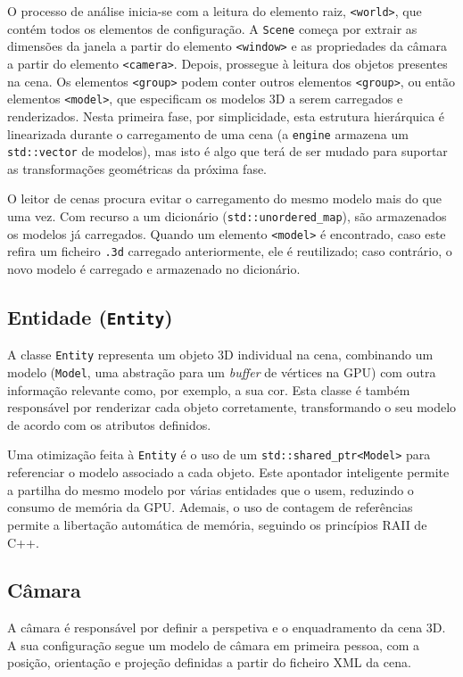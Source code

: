 \documentclass[12pt, a4paper]{article}
\begin{document}
O processo de análise inicia-se com a leitura do elemento raiz, \texttt{<world>}, que contém todos
os elementos de configuração. A \texttt{Scene} começa por extrair as dimensões da janela a partir do
elemento \texttt{<window>} e as propriedades da câmara a partir do elemento \texttt{<camera>}.
Depois, prossegue à leitura dos objetos presentes na cena. Os elementos \texttt{<group>} podem
conter outros elementos \texttt{<group>}, ou então elementos \texttt{<model>}, que especificam os
modelos 3D a serem carregados e renderizados. Nesta primeira fase, por simplicidade, esta estrutura
hierárquica é linearizada durante o carregamento de uma cena (a \texttt{engine} armazena um
\texttt{std::vector} de modelos), mas isto é algo que terá de ser mudado para suportar as
transformações geométricas da próxima fase.

O leitor de cenas procura evitar o carregamento do mesmo modelo mais do que uma vez. Com recurso a
um dicionário (\texttt{std::unordered\_map}), são armazenados os modelos já carregados. Quando um
elemento \texttt{<model>} é encontrado, caso este refira um ficheiro \texttt{.3d} carregado
anteriormente, ele é reutilizado; caso contrário, o novo modelo é carregado e armazenado no
dicionário.

\subsection{Entidade (\texttt{Entity})}

A classe \texttt{Entity} representa um objeto 3D individual na cena, combinando um modelo
(\texttt{Model}, uma abstração para um \emph{buffer} de vértices na GPU) com outra informação
relevante como, por exemplo, a sua cor. Esta classe é também responsável por renderizar cada objeto
corretamente, transformando o seu modelo de acordo com os atributos definidos.

Uma otimização feita à \texttt{Entity} é o uso de um \texttt{std::shared\_ptr<Model>} para
referenciar o modelo associado a cada objeto. Este apontador inteligente permite a partilha do mesmo
modelo por várias entidades que o usem, reduzindo o consumo de memória da GPU. Ademais, o uso de
contagem de referências permite a libertação automática de memória, seguindo os princípios RAII de
C++.

\subsection{Câmara}

A câmara é responsável por definir a perspetiva e o enquadramento da cena 3D. A sua configuração
segue um modelo de câmara em primeira pessoa, com a posição, orientação e projeção definidas a
partir do ficheiro XML da cena.
\end{document}
